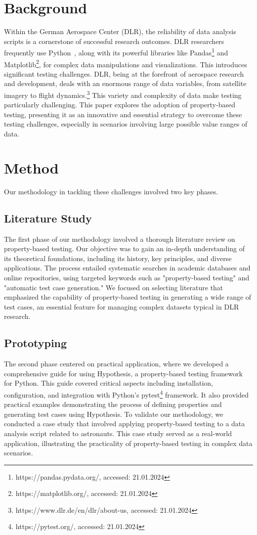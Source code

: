 \documentclass[runningheads]{llncs}
\begin{document}
\section{Background}
Within the German Aerospace Center (DLR), the reliability of data analysis scripts is a cornerstone of successful research outcomes. DLR researchers frequently use Python~\cite{Kurnatowski2020}, along with its powerful libraries like Pandas\footnote{https://pandas.pydata.org/, accessed: 21.01.2024} and Matplotlib\footnote{https://matplotlib.org/, accessed: 21.01.2024}, for complex data manipulations and visualizations. This introduces significant testing challenges. DLR, being at the forefront of aerospace research and development, deals with an enormous range of data variables, from satellite imagery to flight dynamics.\footnote{https://www.dlr.de/en/dlr/about-us, accessed: 21.01.2024} This variety and complexity of data make testing particularly challenging. This paper explores the adoption of property-based testing, presenting it as an innovative and essential strategy to overcome these testing challenges, especially in scenarios involving large possible value ranges of data.

\section{Method}
Our methodology in tackling these challenges involved two key phases.

\subsection{Literature Study}
The first phase of our methodology involved a thorough literature review on property-based testing. Our objective was to gain an in-depth understanding of its theoretical foundations, including its history, key principles, and diverse applications. The process entailed systematic searches in academic databases and online repositories, using targeted keywords such as "property-based testing" and "automatic test case generation." We focused on selecting literature that emphasized the capability of property-based testing in generating a wide range of test cases, an essential feature for managing complex datasets typical in DLR research.

\subsection{Prototyping}
The second phase centered on practical application, where we developed a comprehensive guide for using Hypothesis, a property-based testing framework for Python. This guide covered critical aspects including installation, configuration, and integration with Python's pytest\footnote{https://pytest.org/, accessed: 21.01.2024} framework. It also provided practical examples demonstrating the process of defining properties and generating test cases using Hypothesis. To validate our methodology, we conducted a case study that involved applying property-based testing to a data analysis script related to astronauts. This case study served as a real-world application, illustrating the practicality of property-based testing in complex data scenarios.
\end{document}

